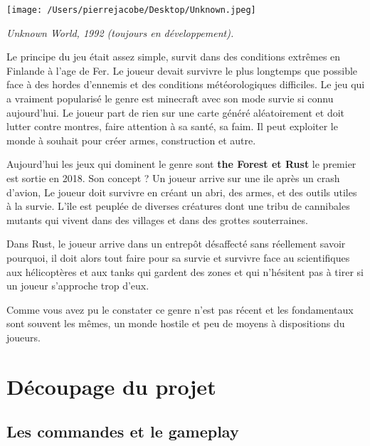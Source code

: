 \documentclass{article}
\begin{document}
\begin{center}
\texttt{[image: /Users/pierrejacobe/Desktop/Unknown.jpeg]}
\end{center}


\begin{center}
	\emph{Unknown World, 1992 (toujours en développement).}
\end{center}

\par 
Le principe du jeu était assez simple, survit dans des conditions extrêmes en Finlande à l'age de Fer. Le joueur devait survivre le plus longtemps que possible face à des hordes d'ennemis et des conditions météorologiques difficiles. Le jeu qui a vraiment popularisé le genre est minecraft avec son mode survie si connu aujourd'hui. Le joueur part de rien sur une carte généré aléatoirement et doit lutter contre montres, faire attention à sa santé, sa faim. Il peut exploiter le monde à souhait pour créer armes,  construction et autre.
\newline

\par
Aujourd'hui les jeux qui dominent le genre sont \textbf{the Forest et Rust}  le premier est sortie en 2018. Son concept ? Un joueur arrive sur une ile après un crash d'avion, Le joueur doit survivre en créant un abri, des armes, et des outils utiles à la survie. L'île est peuplée de diverses créatures dont une tribu de cannibales mutants qui vivent dans des villages et dans des grottes souterraines. 
\newline
\par 
Dans Rust, le joueur arrive dans un entrepôt désaffecté  sans réellement savoir pourquoi, il doit alors tout faire pour sa survie  et survivre face au scientifiques aux hélicoptères et aux tanks qui gardent des zones et qui n’hésitent pas à tirer si un joueur s’approche trop d’eux.
\newline

\par 
Comme vous avez pu le constater ce genre n'est pas récent et les fondamentaux sont souvent les mêmes, un monde hostile et peu de moyens à dispositions du joueurs.
\newline


\newpage
\section{Découpage du projet}
\subsection{Les commandes et le gameplay}
\end{document}
